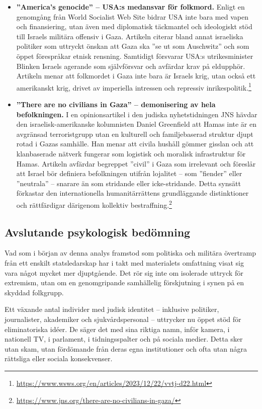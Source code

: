\begin{itemize}
\item \textbf{”America’s genocide” – USA:s medansvar för folkmord.} Enligt en genomgång från World Socialist Web Site bidrar USA inte bara med vapen och finansiering, utan även med diplomatisk täckmantel och ideologiskt stöd till Israels militära offensiv i Gaza. Artikeln citerar bland annat israeliska politiker som uttryckt önskan att Gaza ska ”se ut som Auschwitz” och som öppet förespråkar etnisk rensning. Samtidigt försvarar USA:s utrikesminister Blinken Israels agerande som självförsvar och avfärdar krav på eldupphör. Artikeln menar att folkmordet i Gaza inte bara är Israels krig, utan också ett amerikanskt krig, drivet av imperiella intressen och repressiv inrikespolitik.\footnote{\url{https://www.wsws.org/en/articles/2023/12/22/vvtj-d22.html}}

\item \textbf{”There are no civilians in Gaza” – demonisering av hela befolkningen.} I en opinionsartikel i den judiska nyhetstidningen JNS hävdar den israelisk-amerikanske kolumnisten Daniel Greenfield att Hamas inte är en avgränsad terroristgrupp utan en kulturell och familjebaserad struktur djupt rotad i Gazas samhälle. Han menar att civila hushåll gömmer gisslan och att klanbaserade nätverk fungerar som logistisk och moralisk infrastruktur för Hamas. Artikeln avfärdar begreppet ”civil” i Gaza som irrelevant och föreslår att Israel bör definiera befolkningen utifrån lojalitet – som ”fiender” eller ”neutrala” – snarare än som stridande eller icke-stridande. Detta synsätt förkastar den internationella humanitärrättens grundläggande distinktioner och rättfärdigar därigenom kollektiv bestraffning.\footnote{\url{https://www.jns.org/there-are-no-civilians-in-gaza/}}


\end{itemize}


\subsection{Avslutande psykologisk bedömning}

Vad som i början av denna analys framstod som politiska och militära övertramp från ett enskilt statsledarskap har i takt med materialets omfattning visat sig vara något mycket mer djuptgående. Det rör sig inte om isolerade uttryck för extremism, utan om en genomgripande samhällelig förskjutning i synen på en skyddad folkgrupp. 

Ett växande antal individer med judisk identitet – inklusive politiker, journalister, akademiker och sjukvårdspersonal – uttrycker nu öppet stöd för eliminatoriska idéer. De säger det med sina riktiga namn, inför kamera, i nationell TV, i parlament, i tidningsspalter och på sociala medier. Detta sker utan skam, utan fördömande från deras egna institutioner och ofta utan några rättsliga eller sociala konsekvenser.

